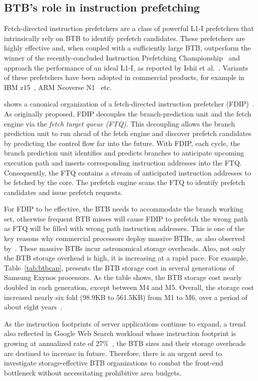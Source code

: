 \subsection{BTB's role in instruction prefetching}
Fetch-directed instruction prefetchers are a class of powerful L1-I prefetchers that intrinsically rely on BTB to identify prefetch candidates. 
These prefetchers are highly effective and, when coupled with a sufficiently large BTB, outperform the winner of the recently-concluded Instruction Prefetching Championship~\cite{ipc1} and approach the performance of an ideal L1-I, as reported by Ishii et al.~\cite{rebase}. Variants of these prefetchers have been adopted in commercial products, for example in IBM z15~\cite{IBMz15HotChips}, ARM Neoverse N1~\cite{neoverse} etc.

 shows a canonical organization of a fetch-directed instruction prefetcher (FDIP)~\cite{fdip}. 
As originally proposed, FDIP decouples the branch-prediction unit and the fetch engine via the {\em fetch target queue (FTQ)}. This decoupling allows the branch prediction unit to run ahead of the fetch engine and discover prefetch candidates by predicting the control flow far into the future. With FDIP, each cycle, the branch prediction unit identifies and predicts branches to anticipate upcoming execution path and inserts corresponding instruction addresses into the FTQ. Consequently, the FTQ contains a stream of anticipated instruction addresses to be fetched by the core. The prefetch engine scans the FTQ to identify prefetch candidates and issue prefetch requests. 

For FDIP to be effective, the BTB needs to accommodate the branch working set, otherwise frequent BTB misses will cause FDIP to prefetch the wrong path as FTQ will be filled with wrong path instruction addresses. This is one of the key reasons why commercial processors deploy massive BTBs, as also observed by~\cite{rebase}. These massive BTBs incur astronomical storage overheads. Also, not only the BTB storage overhead is high, it is increasing at a rapid pace. For example, Table~\ref{tab:btbcap}, presents the BTB storage cost in several generations of Samsung Exynos processors. As the table shows, the BTB storage cost nearly doubled in each generation, except between M4 and M5. Overall, the storage cost increased nearly six fold (98.9KB to 561.5KB) from M1 to M6, over a period of about eight years~\cite{exynos}.

As the instruction footprints of server applications continue to expand, a trend also reflected in Google Web Search workload whose instruction footprint is growing at annualized rate of 27\%~\cite{profileWarehouse}, the BTB sizes and their storage overheads are destined to increase in future. Therefore, there is an urgent need to investigate storage-effective BTB organizations to combat the front-end bottleneck without necessitating prohibitive area budgets.

